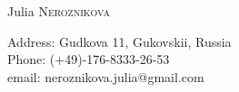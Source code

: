 \documentclass[a4paper,10pt]{article}
\begin{document}
\noindent\begin{minipage}{0.55\textwidth}%
\par{
		{\Huge Julia  \textsc{Neroznikova }
	}\bigskip\par} 

\end{minipage}%
\hfill%
\begin{minipage}{0.45\textwidth}
\vspace{0.2cm}
Address:    Gudkova 11, Gukovskii, Russia \\
Phone:    (+49)-176-8333-26-53\\
email:     {neroznikova.julia@gmail.com}
\end{minipage}%

\end{document}
